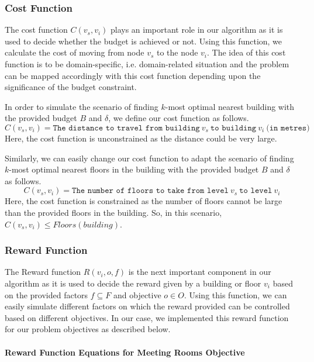 \subsubsection{Cost Function}

The cost function $C(v_s, v_i)$ plays an important role in our algorithm as it is used to decide whether the budget is achieved or not. Using this function, we calculate the cost of moving from node $v_s$ to the node $v_i$. The idea of this cost function is to be domain-specific, i.e. domain-related situation and the problem can be mapped accordingly with this cost function depending upon the significance of the budget constraint.

In order to simulate the scenario of finding $k$-most optimal nearest building with the provided budget $B$ and $\delta$, we define our cost function as follows.
\begin{equation}
    C(v_s, v_i) = \texttt{The distance to travel from building}\:v_s\:\texttt{to building}\:v_i\:\texttt{(in metres)}
\end{equation}
Here, the cost function is unconstrained as the distance could be very large.

Similarly, we can easily change our cost function to adapt the scenario of finding $k$-most optimal nearest floors in the building with the provided budget $B$ and $\delta$ as follows.
\begin{equation}
    C(v_s, v_i) = \texttt{The number of floors to take from level}\:v_s\:\texttt{to level}\:v_i
\end{equation}
Here, the cost function is constrained as the number of floors cannot be large than the provided floors in the building. So, in this scenario, $C(v_s, v_i) \leq Floors(building)$.

\subsubsection{Reward Function}

The Reward function $R(v_i,o,f)$ is the next important component in our algorithm as it is used to decide the reward given by a building or floor $v_i$ based on the provided factors $f \subseteq F$ and objective $o \in O$. Using this function, we can easily simulate different factors on which the reward provided can be controlled based on different objectives. In our case, we implemented this reward function for our problem objectives as described below.

\paragraph{Reward Function Equations for Meeting Rooms Objective}

